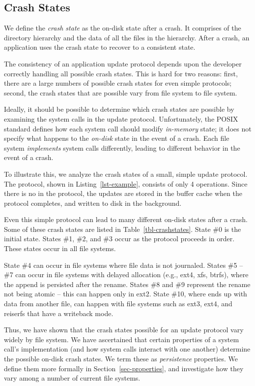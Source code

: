 \subsection{Crash States}
We define the \textit{crash state} as the on-disk state after a crash. It
comprises of the directory hierarchy and the data of all the files in the
hierarchy. After a crash, an application uses the crash state to recover to a
consistent state.  

The consistency of an application update protocol depends upon the developer
correctly handling all possible crash states. This is hard for
two reasons: first, there are a large numbers of possible crash states for even
simple protocols; second, the crash states that are possible vary from file
system to file system.

Ideally, it should be possible to determine which crash states are possible by
examining the system calls in the update protocol.  Unfortunately, the POSIX
standard defines how each system call should modify \textit{in-memory} state;
it does not specify what happens to the \textit{on-disk} state in the event of
a crash. Each file system \textit{implements} system calls differently, leading
to different behavior in the event of a crash.


To illustrate this, we analyze the crash states of a small, simple update
protocol.  The protocol, shown in Listing~\ref{lst-example}, consists of only 4
operations.  Since there is no  in the protocol, the updates are
stored in the buffer cache when the protocol completes, and written to disk in
the background.


Even this simple protocol can lead to many different on-disk states after a
crash. Some of these crash states are listed in Table~\ref{tbl-crashstates}. 
State \#0 is the initial state. States \#1, \#2, and \#3 occur as the protocol
proceeds in order. These states occur in all file systems.

State \#4 can occur in file systems where file data is not journaled. States
\#5 -- \#7 can occur in file systems with delayed allocation (e.g., ext4, xfs,
btrfs), where the append is persisted after the rename. States \#8 and \#9
represent the rename not being atomic -- this can happen only in ext2. State
\#10, where  ends up with data from another file, can happen with
file systems such as ext3, ext4, and reiserfs that have a writeback mode.

Thus, we have shown that the crash states possible for an update protocol vary
widely by file system. We have ascertained that certain properties of a system
call's implementation (and how system calls interact with one another)
determine the possible on-disk crash states. We term these as
\textit{persistence} properties. We define them more formally in
Section~\ref{sec-properties}, and investigate how they vary among a number of
current file systems. 


